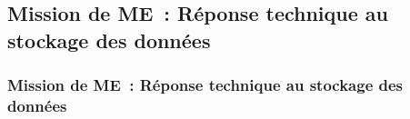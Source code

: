 \subsection{Mission de ME~: Réponse technique au stockage des données}
\begin{frame}
	\frametitle{Mission de ME~: Réponse technique au stockage des données}
\end{frame}

